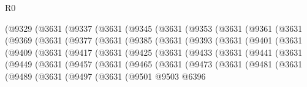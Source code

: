 \begin{lexlean}{R0}
\begin{coremodule}
    (@9329
      (@3631
        (@9337
          (@3631
            (@9345
              (@3631
                (@9353
                  (@3631
                    (@9361
                      (@3631
                        (@9369
                          (@3631
                            (@9377
                              (@3631
                                (@9385
                                  (@3631
                                    (@9393
                                      (@3631
                                        (@9401
                                          (@3631
                                            (@9409
                                              (@3631
                                                (@9417
                                                  (@3631
                                                    (@9425
                                                      (@3631
                                                        (@9433
                                                          (@3631
                                                            (@9441
                                                              (@3631
                                                                (@9449
                                                                  (@3631
                                                                    (@9457
                                                                      (@3631
                                                                        (@9465
                                                                          (@3631
                                                                            (@9473
                                                                              (@3631
                                                                                (@9481
                                                                                  (@3631
                                                                                    (@9489
                                                                                      (@3631
                                                                                        (@9497
                                                                                          (@3631
                                                                                            (@9501
                                                                                              @9503
                                                                                              @6396

\end{coremodule}
\end{lexlean}
